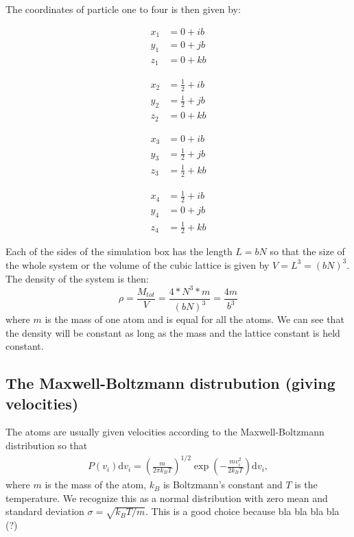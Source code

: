 \documentclass[11pt,a4wide]{article}
\newcommand{\dm}[1]{\mathrm{d}#1}
\begin{document}
The coordinates of particle one to four is then given by:

\begin{minipage}{0.2\textwidth}
\begin{align*}
x_1 &= 0 + ib\\
y_1 &= 0 + jb \\
z_1 &= 0 + kb
\end{align*}
\end{minipage}
\begin{minipage}{0.25\textwidth}
\begin{align*}
x_2 &= \frac{1}{2} + ib\\
y_2 &= \frac{1}{2} + jb \\
z_2 &= 0 + kb
\end{align*}
\end{minipage}
\begin{minipage}{0.25\textwidth}
\begin{align*}
x_3 &= 0 + ib\\
y_3 &= \frac{1}{2} + jb \\
z_3 &= \frac{1}{2} + kb
\end{align*}
\end{minipage}
\begin{minipage}{0.25\textwidth}
\begin{align*}
x_4 &= \frac{1}{2} + ib\\
y_4 &= 0 + jb \\
z_4 &= \frac{1}{2} + kb
\end{align*}
\end{minipage}

Each of the sides of the simulation box has the length $L = bN$ so that the size of the whole system or the volume of the cubic lattice is given by $V = L^3 = (bN)^3$. The density of the system is then:
\[
\rho = \frac{M_{tot}}{V} = \frac{4*N^3*m}{(bN)^3} = \frac{4m}{b^3}
\]
where $m$ is the mass of one atom and is equal for all the atoms. We can see that the density will be constant as long as the mass and the lattice constant is held constant. 

\subsection{The Maxwell-Boltzmann distrubution (giving velocities)}
The atoms are usually given velocities according to the Maxwell-Boltzmann distribution so that
\begin{align}
	\label{eq:maxwell_boltzmann}
	P(v_i)\dm{v_i} = \left(\frac{m}{2\pi k_B T}\right)^{1/2} \exp\left(-\frac{m v_i^2}{2k_B T}\right) \dm{v_i},
\end{align}
where $m$ is the mass of the atom, $k_B$ is Boltzmann's constant and $T$ is the temperature. We recognize this as a normal distribution with zero mean and standard deviation $\sigma = \sqrt{k_B T/m}$. This is a good choice because bla bla bla bla (?) 
\end{document}
